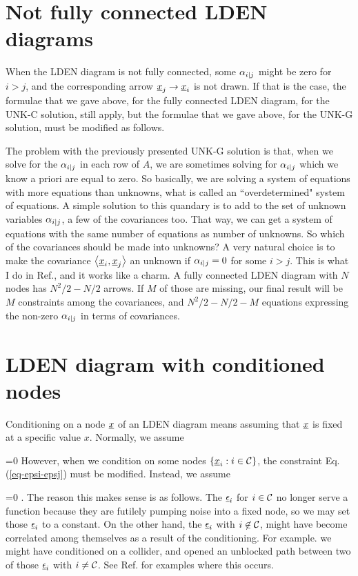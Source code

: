 \section{Not fully connected LDEN diagrams}

When the LDEN diagram is not
fully connected, some $\alpha_{i|j}$
might be zero for $i>j$, and the
corresponding arrow ${\underline{x}}_j\rightarrow{\underline{x}}_i$
is not drawn. If that is the case,
the formulae that we gave above,
for the fully connected LDEN diagram,
for the UNK-C solution, still apply,
but the formulae that we gave above, for the UNK-G solution,
must be modified as follows.

The problem with the previously
presented UNK-G solution is that,
when we solve for the $\alpha_{i|j}$
in each row of $A$,
we are sometimes solving for $\alpha_{i|j}$
which we know a priori are equal to zero.
So basically, we are solving a system of equations with more equations than unknowns,
what is called an ``overdetermined" system
of equations. A simple solution
to this quandary is to add to the set
of unknown variables $\alpha_{i|j}$,
a few of the covariances too.
That way, we can get a system
of equations with the same number of
equations as number of unknowns.
So which of the covariances
should be made into unknowns?
A very natural choice
is to make the covariance $\left\langle{\underline{x}}_i, {\underline{x}}_j\right\rangle$
an unknown if $\alpha_{i|j}=0$
for some $i>j$.
This is what I do in Ref.\cite{scumpy},
and it works like a charm.
A fully connected LDEN diagram with $N$ nodes
has $N^2/2-N/2$ arrows. If $M$ of those are 
missing, our final result 
will be $M$ constraints among the 
covariances, and $N^2/2-N/2 - M$
equations expressing the non-zero $\alpha_{i|j}$
in terms of covariances.


\section{LDEN diagram with conditioned nodes}

Conditioning on a node ${\underline{x}}$ 
of an LDEN diagram means assuming that ${\underline{x}}$  is
fixed at a specific value $x$.
Normally, we assume 

\beq
{}=0
\quad{}
\label{eq-epsi-epsj}
\eeq
However, when we condition on some nodes $\{{\underline{x}}_i: i\in {\cal C}\}$, the constraint
Eq.(\ref{eq-epsi-epsj}) must be modified. Instead, we assume

 \beq{}=0
 \quad {}.
 \eeq
 The reason this makes sense is as follows.
 The $\underline{\epsilon}_i$ for $i\in {\cal C}$
 no longer serve a function because 
 they are futilely pumping noise into a fixed node,
 so we may set those $\underline{\epsilon}_i$ to a constant. 
 On the other hand,
 the  $\underline{\epsilon}_i$ with $i \not \in {\cal C}$, might have become correlated among themselves
 as a result  of the conditioning.
 For example.
  we might have conditioned on a collider, and opened an unblocked path between two of those $\underline{\epsilon}_i$ with $i\neq {\cal C}$. 
See Ref.\cite{scumpy}
for examples where this occurs.

